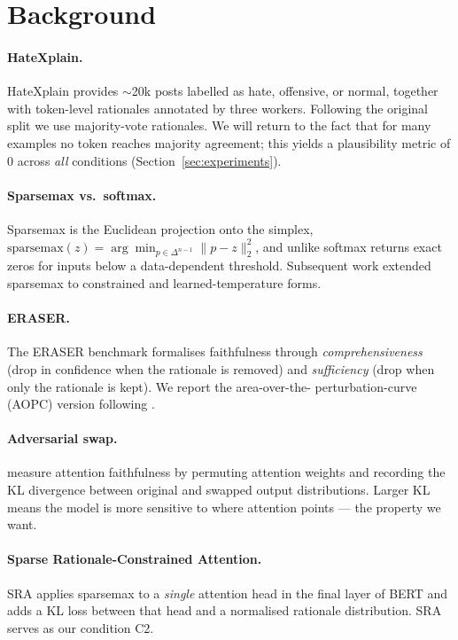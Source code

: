\documentclass{article}
\begin{document}
\section{Background}
\label{sec:background}

\paragraph{HateXplain.} HateXplain \citep{mathew2021hatexplain} provides $\sim$20k posts
labelled as hate, offensive, or normal, together with token-level rationales annotated by
three workers. Following the original split we use majority-vote rationales. We will
return to the fact that for many examples no token reaches majority agreement; this
yields a plausibility metric of $0$ across \emph{all} conditions
(Section~\ref{sec:experiments}).

\paragraph{Sparsemax vs.\ softmax.} Sparsemax \citep{martins2016sparsemax} is the
Euclidean projection onto the simplex,
$\mathrm{sparsemax}(z) = \arg\min_{p \in \Delta^{n-1}} \|p - z\|_2^2$, and unlike softmax
returns exact zeros for inputs below a data-dependent threshold. Subsequent work extended
sparsemax to constrained \citep{malaviya2018sparse} and learned-temperature
\citep{correia2019adaptively} forms.

\paragraph{ERASER.} The ERASER benchmark \citep{deyoung2020eraser} formalises faithfulness
through \emph{comprehensiveness} (drop in confidence when the rationale is removed) and
\emph{sufficiency} (drop when only the rationale is kept). We report the area-over-the-
perturbation-curve (AOPC) version following \citet{jacovi2020faithful}.

\paragraph{Adversarial swap.} \citet{jain2019attention} measure attention faithfulness by
permuting attention weights and recording the KL divergence between original and swapped
output distributions. Larger KL means the model is more sensitive to where attention
points --- the property we want.

\paragraph{Sparse Rationale-Constrained Attention.} SRA \citep{eilertsen2025aligning}
applies sparsemax to a \emph{single} attention head in the final layer of BERT and adds a
KL loss between that head and a normalised rationale distribution. SRA serves as our
condition C2.
\end{document}
